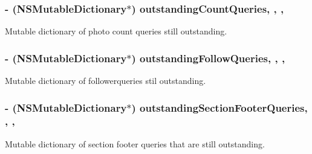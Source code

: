 \subsubsection[{outstanding\+Count\+Queries}]{\setlength{\rightskip}{0pt plus 5cm}-\/ (N\+S\+Mutable\+Dictionary$\ast$) outstanding\+Count\+Queries\hspace{0.3cm}{\ttfamily [read]}, {\ttfamily [write]}, {\ttfamily [nonatomic]}, {\ttfamily [strong]}}\label{interface_e_s_recent_view_controller_a4781916b5b111f1570d40cb7af6ff7e8}
Mutable dictionary of photo count queries still outstanding. \hypertarget{interface_e_s_recent_view_controller_a0f4d2611b615a9976521a98efe54aaf6}{}
\subsubsection[{outstanding\+Follow\+Queries}]{\setlength{\rightskip}{0pt plus 5cm}-\/ (N\+S\+Mutable\+Dictionary$\ast$) outstanding\+Follow\+Queries\hspace{0.3cm}{\ttfamily [read]}, {\ttfamily [write]}, {\ttfamily [nonatomic]}, {\ttfamily [strong]}}\label{interface_e_s_recent_view_controller_a0f4d2611b615a9976521a98efe54aaf6}
Mutable dictionary of followerqueries stil outstanding. \hypertarget{interface_e_s_recent_view_controller_a59147e91883b4bf7c0ac1dff774a059c}{}
\subsubsection[{outstanding\+Section\+Footer\+Queries}]{\setlength{\rightskip}{0pt plus 5cm}-\/ (N\+S\+Mutable\+Dictionary$\ast$) outstanding\+Section\+Footer\+Queries\hspace{0.3cm}{\ttfamily [read]}, {\ttfamily [write]}, {\ttfamily [nonatomic]}, {\ttfamily [strong]}}\label{interface_e_s_recent_view_controller_a59147e91883b4bf7c0ac1dff774a059c}
Mutable dictionary of section footer queries that are still outstanding. \hypertarget{interface_e_s_recent_view_controller_aef7c45ea8ddfadc7182f14c3474954bc}{}
